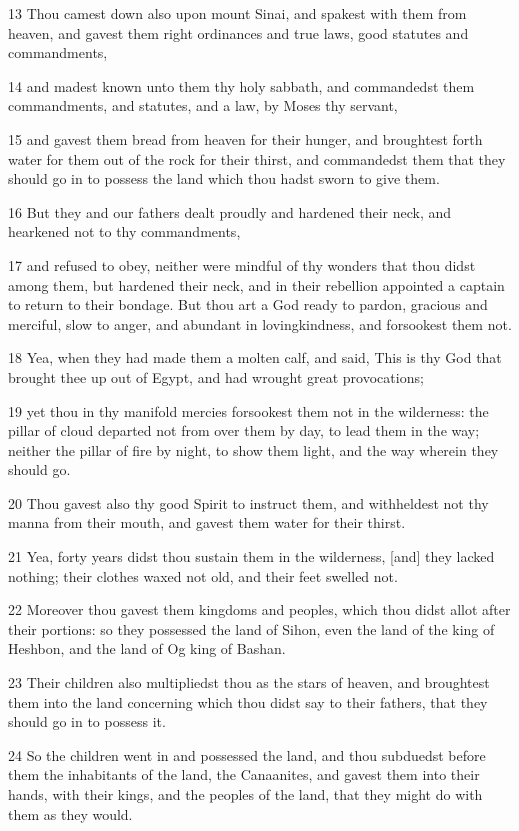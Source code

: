 \par 13 Thou camest down also upon mount Sinai, and spakest with them from heaven, and gavest them right ordinances and true laws, good statutes and commandments,
\par 14 and madest known unto them thy holy sabbath, and commandedst them commandments, and statutes, and a law, by Moses thy servant,
\par 15 and gavest them bread from heaven for their hunger, and broughtest forth water for them out of the rock for their thirst, and commandedst them that they should go in to possess the land which thou hadst sworn to give them.
\par 16 But they and our fathers dealt proudly and hardened their neck, and hearkened not to thy commandments,
\par 17 and refused to obey, neither were mindful of thy wonders that thou didst among them, but hardened their neck, and in their rebellion appointed a captain to return to their bondage. But thou art a God ready to pardon, gracious and merciful, slow to anger, and abundant in lovingkindness, and forsookest them not.
\par 18 Yea, when they had made them a molten calf, and said, This is thy God that brought thee up out of Egypt, and had wrought great provocations;
\par 19 yet thou in thy manifold mercies forsookest them not in the wilderness: the pillar of cloud departed not from over them by day, to lead them in the way; neither the pillar of fire by night, to show them light, and the way wherein they should go.
\par 20 Thou gavest also thy good Spirit to instruct them, and withheldest not thy manna from their mouth, and gavest them water for their thirst.
\par 21 Yea, forty years didst thou sustain them in the wilderness, [and] they lacked nothing; their clothes waxed not old, and their feet swelled not.
\par 22 Moreover thou gavest them kingdoms and peoples, which thou didst allot after their portions: so they possessed the land of Sihon, even the land of the king of Heshbon, and the land of Og king of Bashan.
\par 23 Their children also multipliedst thou as the stars of heaven, and broughtest them into the land concerning which thou didst say to their fathers, that they should go in to possess it.
\par 24 So the children went in and possessed the land, and thou subduedst before them the inhabitants of the land, the Canaanites, and gavest them into their hands, with their kings, and the peoples of the land, that they might do with them as they would.
